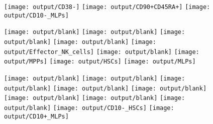 \documentclass[11pt]{article}
\begin{document}
\begin{figure}[htbp]
\begin{minipage}[t]{0.125\textwidth}
    \texttt{[image: output/CD38-]}
    \texttt{[image: output/CD90+CD45RA+]}
    \texttt{[image: output/CD10-\_MLPs]}
  \end{minipage}%
  \begin{minipage}[t]{0.125\textwidth}
    \centering
    \texttt{[image: output/blank]}
    \texttt{[image: output/blank]}
    \texttt{[image: output/blank]}
    \texttt{[image: output/blank]}
    \texttt{[image: output/Effector\_NK\_cells]}
    \texttt{[image: output/blank]}
    \texttt{[image: output/MPPs]}
    \texttt{[image: output/HSCs]}
    \texttt{[image: output/MLPs]}

  \end{minipage}%
  \begin{minipage}[t]{0.125\textwidth}
    \centering
    \vspace{-0.333\linewidth} %
    \texttt{[image: output/blank]}
    \texttt{[image: output/blank]}
    \texttt{[image: output/blank]}
    \texttt{[image: output/blank]}
    \texttt{[image: output/blank]}
    \texttt{[image: output/blank]}
    \texttt{[image: output/blank]}
    \texttt{[image: output/blank]}
    \texttt{[image: output/CD10-\_HSCs]}
    \texttt{[image: output/CD10+\_MLPs]}

  \end{minipage}%
  \label{fig:figure}
\end{figure}
\end{document}
